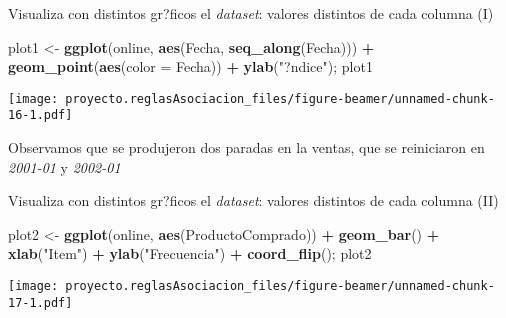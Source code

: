 \documentclass[
  ignorenonframetext,
]{beamer}
\newenvironment{Shaded}{\begin{snugshade}}{\end{snugshade}}
\newcommand{\DataTypeTok}[1]{\textcolor[rgb]{0.13,0.29,0.53}{#1}}
\newcommand{\KeywordTok}[1]{\textcolor[rgb]{0.13,0.29,0.53}{\textbf{#1}}}
\newcommand{\NormalTok}[1]{#1}
\newcommand{\OperatorTok}[1]{\textcolor[rgb]{0.81,0.36,0.00}{\textbf{#1}}}
\newcommand{\StringTok}[1]{\textcolor[rgb]{0.31,0.60,0.02}{#1}}
\begin{document}
\begin{frame}[fragile]{Visualiza con distintos gr?ficos el
\emph{dataset}: valores distintos de cada columna (I)}
\protect\hypertarget{visualiza-con-distintos-grficos-el-dataset-valores-distintos-de-cada-columna-i}{}

\begin{Shaded}
\begin{Highlighting}[]
\NormalTok{plot1 <-}\StringTok{ }\KeywordTok{ggplot}\NormalTok{(online, }\KeywordTok{aes}\NormalTok{(Fecha, }\KeywordTok{seq_along}\NormalTok{(Fecha))) }\OperatorTok{+}\StringTok{ }
\StringTok{  }\KeywordTok{geom_point}\NormalTok{(}\KeywordTok{aes}\NormalTok{(}\DataTypeTok{color =}\NormalTok{ Fecha)) }\OperatorTok{+}\StringTok{ }\KeywordTok{ylab}\NormalTok{(}\StringTok{"?ndice"}\NormalTok{); plot1}
\end{Highlighting}
\end{Shaded}

\texttt{[image: proyecto.reglasAsociacion\_files/figure-beamer/unnamed-chunk-16-1.pdf]}

Observamos que se produjeron dos paradas en la ventas, que se
reiniciaron en \emph{2001-01} y \emph{2002-01}

\end{frame}

\begin{frame}[fragile]{Visualiza con distintos gr?ficos el
\emph{dataset}: valores distintos de cada columna (II)}
\protect\hypertarget{visualiza-con-distintos-grficos-el-dataset-valores-distintos-de-cada-columna-ii}{}

\begin{Shaded}
\begin{Highlighting}[]
\NormalTok{plot2 <-}\StringTok{ }\KeywordTok{ggplot}\NormalTok{(online, }\KeywordTok{aes}\NormalTok{(ProductoComprado)) }\OperatorTok{+}\StringTok{ }
\StringTok{  }\KeywordTok{geom_bar}\NormalTok{() }\OperatorTok{+}\StringTok{ }
\StringTok{  }\KeywordTok{xlab}\NormalTok{(}\StringTok{"Item"}\NormalTok{) }\OperatorTok{+}\StringTok{ }\KeywordTok{ylab}\NormalTok{(}\StringTok{"Frecuencia"}\NormalTok{) }\OperatorTok{+}\StringTok{ }
\StringTok{  }\KeywordTok{coord_flip}\NormalTok{(); plot2}
\end{Highlighting}
\end{Shaded}

\texttt{[image: proyecto.reglasAsociacion\_files/figure-beamer/unnamed-chunk-17-1.pdf]}

\end{frame}
\end{document}

